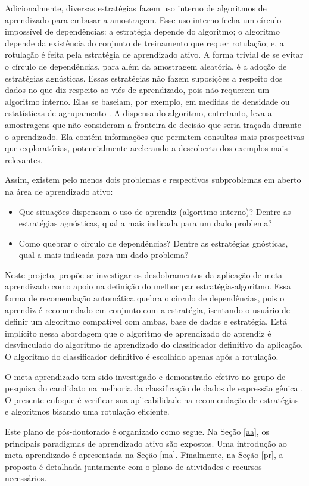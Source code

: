 Adicionalmente, diversas estratégias fazem uso interno de algoritmos de aprendizado para
embasar a amostragem.
Esse uso interno fecha um círculo impossível de dependências:
a estratégia depende do algoritmo; o algoritmo depende da existência do conjunto
de treinamento que requer rotulação; e,
a rotulação é feita pela estratégia de aprendizado ativo.
A forma trivial de se evitar o círculo de dependências, para além da amostragem aleatória,
é a adoção de estratégias agnósticas.
Essas estratégias não fazem suposições a respeito dos dados no que diz respeito ao viés de
aprendizado, pois não requerem um algoritmo interno.
Elas se baseiam, por exemplo, em medidas de densidade ou estatísticas de agrupamento
\citep{journals/tcs/Dasgupta11}.
A dispensa do algoritmo, entretanto, leva a amostragens que não consideram a fronteira
de decisão que seria traçada durante o aprendizado.
Ela contém informações que permitem consultas mais prospectivas que exploratórias,
potencialmente acelerando a descoberta dos exemplos mais relevantes.

Assim, existem pelo menos dois problemas e respectivos subproblemas em aberto na área
de aprendizado ativo:
\begin{itemize}
 \item Que situações dispensam o uso de aprendiz (algoritmo interno)?
 Dentre as estratégias agnósticas, qual a mais indicada para um dado problema?
 \item Como quebrar o círculo de dependências?
 Dentre as estratégias gnósticas, qual a mais indicada para um dado problema?
\end{itemize}

Neste projeto, propõe-se investigar os desdobramentos da aplicação de meta-aprendizado como apoio 
na definição do melhor par estratégia-algoritmo.
Essa forma de recomendação automática quebra o círculo de dependências, pois o aprendiz é recomendado em
conjunto com a estratégia, isentando o usuário de definir um algoritmo compatível com
ambas, base de dados e estratégia.
Está implícito nessa abordagem que o algoritmo de aprendizado do aprendiz é desvinculado
do algoritmo de aprendizado do classificador definitivo da aplicação.
O algoritmo do classificador definitivo é escolhido apenas após a rotulação.

O meta-aprendizado tem sido investigado e demonstrado efetivo no grupo de pesquisa
do candidato na melhoria da classificação de dados de expressão gênica
\cite{souza2010c,souza2010b,souza2009,1442541}.
O presente enfoque é verificar sua aplicabilidade na recomendação de estratégias e algoritmos
bisando uma rotulação eficiente.

 Este plano de pós-doutorado é organizado como segue.
 Na Seção \ref{aa}, os principais paradigmas de aprendizado ativo são expostos.
Uma introdução ao meta-aprendizado é apresentada na Seção \ref{ma}.
Finalmente, na Seção \ref{pr}, a proposta é detalhada juntamente com o plano de atividades e recursos necessários.
